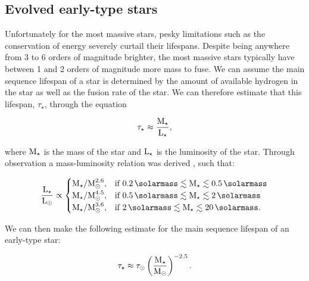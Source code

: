 \subsection{Evolved early-type stars}
\label{sec:evolvedstars}
Unfortunately for the most massive stars, pesky limitations such as the conservation of energy severely curtail their lifespans.
Despite being anywhere from 3 to 6 orders of magnitude brighter, the most massive stars typically have between 1 and 2 orders of magnitude more mass to fuse.
We can assume the main sequence lifespan of a star is determined by the amount of available hydrogen in the star as well as the fusion rate of the star.
We can therefore estimate that this lifespan, $\tau_\star$, through the equation

\begin{equation}
  \tau_\star \approx \frac{\text{M}_\star}{\text{L}_\star} ,
\end{equation}

\noindent
where $\text{M}_\star$ is the mass of the star and $\text{L}_\star$ is the luminosity of the star.
Through observation a mass-luminosity relation was derived \parencite[139]{salarisEvolutionStarsStellar2005}, such that:

\begin{equation}
  \frac{\lumin_\star}{\lumin\sol} \propto
  \begin{cases}
    \mass_\star / \mass\sol^{2.6} , & \text{if } \SI{0.2}{\solarmass} \lesssim \mass_\star \lesssim \SI{0.5}{\solarmass} \\
    \mass_\star / \mass\sol^{4.5} , & \text{if } \SI{0.5}{\solarmass} \lesssim \mass_\star \lesssim \SI{2}{\solarmass} \\
    \mass_\star / \mass\sol^{3.6} , & \text{if } \SI{2}{\solarmass} \lesssim \mass_\star \lesssim \SI{20}{\solarmass} .
  \end{cases}
\end{equation}

\noindent
We can then make the following estimate for the main sequence lifespan of an early-type star:

\begin{equation}
  \label{eq:mass-lifespan}
  \tau_\star \approx \tau_{\odot} \left(\frac{\text{M}_\star}{\text{M}_{\odot}}\right)^{-2.5}.
\end{equation}

